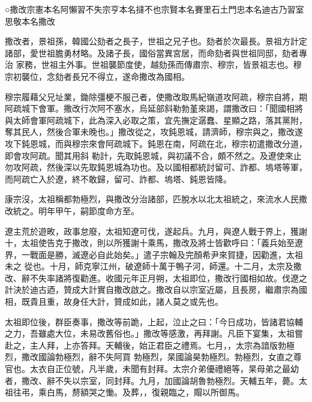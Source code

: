 
\begin{pinyinscope}

 ○撒改宗憲本名阿懶習不失宗亨本名撻不也宗賢本名賽里石土門忠本名迪古乃習室思敬本名撒改



 撒改者，景祖孫，韓國公劾者之長子，世祖之兄子也。劾者於次最長。景祖方計定諸部，愛世祖膽勇材略。及諸子長，國俗當異宮居，而命劾者與世祖同邸，劾者專治
 家務，世祖主外事。世祖襲節度使，越劾孫而傳肅宗、穆宗，皆景祖志也。穆宗初襲位，念劾者長兄不得立，遂命撒改為國相。



 穆宗履藉父兄址業，鋤除彊梗不服己者，使撒改取馬紀嶺道攻阿疏，穆宗自將，期阿疏城下會軍。撒改行次阿不塞水，烏延部斜勒勃堇來謁，謂撒改曰：「聞國相將與太師會軍阿疏城下，此為深入必取之策，宜先撫定潺蠢、星顯之路，落其黨附，奪其民人，然後合軍未晚也。」撒改從之，攻鈍恩城，請濟師，穆宗與之，撒改遂攻下鈍恩城，而與穆宗來會阿疏城下。鈍恩在南，阿疏在北，穆宗初遣撒改分道，即會攻阿疏。聞其用斜
 勒計，先取鈍恩城，與初議不合，頗不然之。及遼使來止勿攻阿疏，然後深以先取鈍恩城為功也。及以國相都統討留可、詐都、塢塔等軍，而阿疏亡入於遼，終不敢歸，留可、詐都、塢塔、鈍恩皆降。



 康宗沒，太祖稱都勃極烈，與撒改分治諸部，匹脫水以北太祖統之，來流水人民撒改統之。明年甲午，嗣節度命方至。



 遼主荒於遊畋，政事怠廢，太祖知遼可伐，遂起兵。九月，與遼人戰于界上，獲謝十，太祖使告克于撒改，則以所獲謝十乘馬，撒改及將士皆歡呼曰：「義兵始至遼界，一戰面是勝，滅遼必自此始矣。」遣子宗翰及完顏希尹來賀捷，因勸進，太祖未之
 從也。十月，師克寧江州，破遼師十萬于鴨子河，師還。十二月，太宗及撒改、辭不失率諸將復勸進。收國元年正月朔，太祖即位，撒改行國相如故。伐遼之計決於迪古迺，贊成大計實自撒改啟之。撒改自以宗室近屬，且長房，繼肅宗為國相，既貴且重，故身任大計，贊成如此，諸人莫之或先也。



 太祖即位後，群臣奏事，撒改等前跪，上起，泣止之曰：「今日成功，皆諸君協輔之力，吾雖處大位，未易改舊俗也。」撒改等感激，再拜謝。凡臣下宴集，太祖嘗赴之，主人拜，上亦答拜。天輔後，始正君臣之禮焉。七月，，太宗為諳版勃極烈，撒改國論勃極烈，辭不失阿買
 勃極烈，杲國論昊勃極烈。勃極烈，女直之尊官也。太衣自正位號，凡半歲，未聞有封拜。太宗介弟優禮絕等，杲母弟之最幼者，撒改、辭不失以宗室，同封拜。九月，加國論胡魯勃極烈。天輔五年，薨。太祖往弔，乘白馬，剺額哭之慟。及葬，，復親臨之，賵以所御馬。




\end{pinyinscope}

